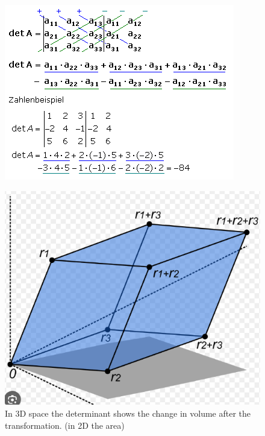 \documentclass[../Main.tex]{subfiles}
\begin{document}

\begin{figure}[H]
    \centering
    \includegraphics[width=0.5\linewidth]{Images/deepl/det.png}
\end{figure}

\begin{figure}[H]
    \centering
    \includegraphics[width=0.5\linewidth]{Images/determinant.png}
    \caption{In 3D space the determinant shows the change in volume after the transformation. (in 2D the area)}
\end{figure}
\end{document}
